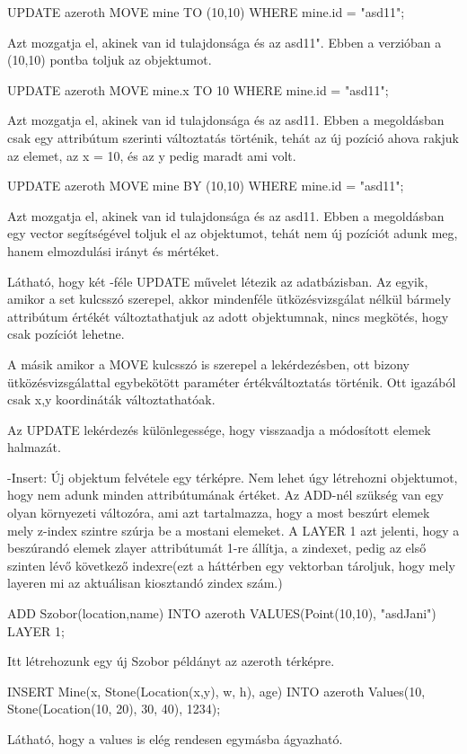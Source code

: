 \begin{sql}
\begin{sql}
UPDATE azeroth MOVE  mine TO  (10,10) WHERE mine.id = "asd11";
\end{sql}
Azt mozgatja el, akinek van id tulajdonsága és az asd11". Ebben a verzióban a (10,10) pontba toljuk az objektumot.
\begin{sql}
UPDATE azeroth MOVE  mine.x TO 10 WHERE mine.id = "asd11";
\end{sql}
Azt mozgatja el, akinek van id tulajdonsága és az asd11. Ebben a megoldásban csak egy attribútum szerinti változtatás történik, tehát az új pozíció ahova rakjuk az elemet, az x = 10, és az y pedig maradt ami volt.
\begin{sql}
UPDATE azeroth MOVE  mine BY  (10,10) WHERE mine.id = "asd11";
\end{sql}
Azt mozgatja el, akinek van id tulajdonsága és az asd11. Ebben a megoldásban egy vector segítségével toljuk el az objektumot, tehát nem új pozíciót adunk meg, hanem elmozdulási irányt és mértéket.

Látható, hogy két -féle UPDATE művelet létezik az adatbázisban. Az egyik, amikor a set kulcsszó szerepel, akkor mindenféle ütközésvizsgálat nélkül bármely attribútum értékét változtathatjuk az adott objektumnak, nincs megkötés, hogy csak pozíciót lehetne.

A másik amikor a MOVE kulcsszó is szerepel a lekérdezésben, ott bizony ütközésvizsgálattal egybekötött paraméter értékváltoztatás történik. Ott igazából  csak x,y koordináták változtathatóak.

Az UPDATE lekérdezés különlegessége, hogy visszaadja a módosított elemek halmazát.

-Insert: Új objektum felvétele egy térképre. 
Nem lehet úgy létrehozni objektumot, hogy nem adunk minden attribútumának értéket.
Az ADD-nél szükség van egy olyan környezeti változóra, ami azt tartalmazza, hogy a most beszúrt elemek mely z-index szintre szúrja be a mostani elemeket.
A LAYER 1 azt jelenti, hogy a beszúrandó elemek zlayer attribútumát 1-re állítja, a zindexet, pedig az első szinten lévő következő indexre(ezt a háttérben egy vektorban tároljuk, hogy mely layeren mi az aktuálisan kiosztandó zindex szám.)
\begin{sql}
ADD Szobor(location,name) INTO azeroth VALUES(Point(10,10), "asdJani") LAYER 1;
\end{sql}
Itt létrehozunk egy új Szobor példányt az azeroth térképre.

\begin{sql}
INSERT Mine(x, Stone(Location(x,y), w, h), age) INTO azeroth Values(10, Stone(Location(10, 20), 30, 40), 1234);
\end{sql}
Látható, hogy a values is elég rendesen egymásba ágyazható.


\end{sql}

